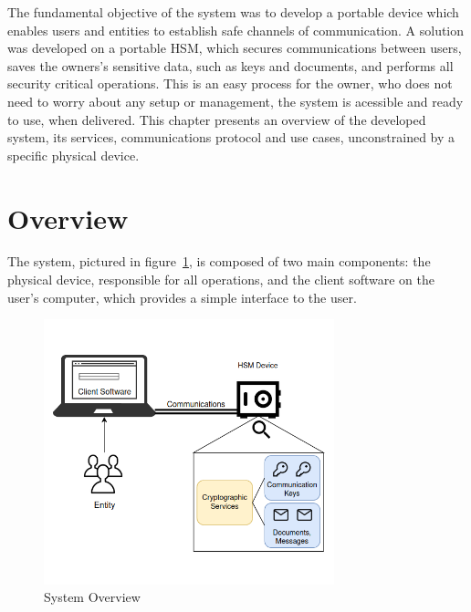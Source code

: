 \cleardoublepage
\label{chap:arch}

The fundamental objective of the system was to develop a portable device which enables users and entities to establish safe channels of communication.
A solution was developed on a portable \ac{HSM}, which secures communications between users, saves the owners's sensitive data, such as keys and documents, and performs all security critical operations. This is an easy process for the owner, who does not need to worry about any setup or management, the system is acessible and ready to use, when delivered.
This chapter presents an overview of the developed system, its services, communications protocol and use cases, unconstrained by a specific physical device.


\section{Overview}\label{chap:arch:overview}

The system, pictured in figure~\ref{fig:overview}, is composed of two main components: the physical device, responsible for all operations, and the client software on the user's computer, which provides a simple interface to the user.

\begin{figure}[h]
    \centering
    \includegraphics[width=0.75\textwidth]{./Images/overview.png}
    \caption{System Overview}
    \label{fig:overview}
\end{figure}

